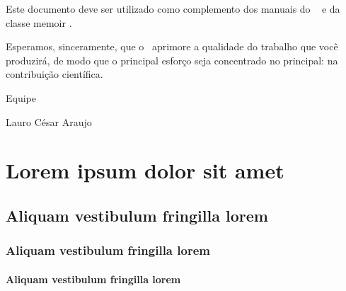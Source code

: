 \documentclass[
	12pt,				%
	openright,			%
	oneside,			%
	a4paper,			%
	dissertacao,			%
	]{ABNT-DC-UEL}
\begin{document}
Este documento deve ser utilizado como complemento dos manuais do \abnTeX\ 
\cite{abntex2classe,abntex2cite,abntex2cite-alf} e da classe \textsf{memoir}
\cite{memoir}. 

Esperamos, sinceramente, que o \abnTeX\ aprimore a qualidade do trabalho que
você produzirá, de modo que o principal esforço seja concentrado no principal:
na contribuição científica.

Equipe \abnTeX 

Lauro César Araujo







\chapter{Lorem ipsum dolor sit amet}

\section{Aliquam vestibulum fringilla lorem}

\lipsum[1]

\subsection{Aliquam vestibulum fringilla lorem}

\lipsum[2]

\subsubsection{Aliquam vestibulum fringilla lorem}

\lipsum[3]
\end{document}

